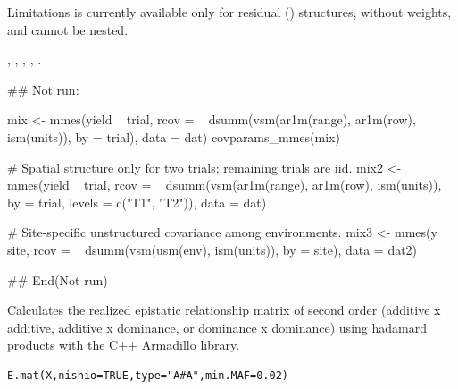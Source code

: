 \documentclass[a4paper]{book}
\begin{document}
%
\begin{Section}{Limitations}
 is currently available only for residual () structures,
without  weights, and cannot be nested.
\end{Section}
%
\begin{SeeAlso}\relax
{}, , , ,
.
\end{SeeAlso}
%
\begin{Examples}
\begin{ExampleCode}
## Not run: 

mix <- mmes(yield ~ trial,
            rcov = ~ dsumm(vsm(ar1m(range), ar1m(row), ism(units)), by = trial),
            data = dat)
covparams_mmes(mix)

# Spatial structure only for two trials; remaining trials are iid.
mix2 <- mmes(yield ~ trial,
             rcov = ~ dsumm(vsm(ar1m(range), ar1m(row), ism(units)),
                            by = trial, levels = c("T1", "T2")),
             data = dat)

# Site-specific unstructured covariance among environments.
mix3 <- mmes(y ~ site,
             rcov = ~ dsumm(vsm(usm(env), ism(units)), by = site),
             data = dat2)

## End(Not run)
\end{ExampleCode}
\end{Examples}
%
\begin{Description}\relax
Calculates the realized epistatic relationship matrix of second order (additive x additive, additive x dominance, or dominance x dominance) using hadamard products with the C++ Armadillo library.
\end{Description}
%
\begin{Usage}
\begin{verbatim}
E.mat(X,nishio=TRUE,type="A#A",min.MAF=0.02)
\end{verbatim}
\end{Usage}
%
\end{document}
